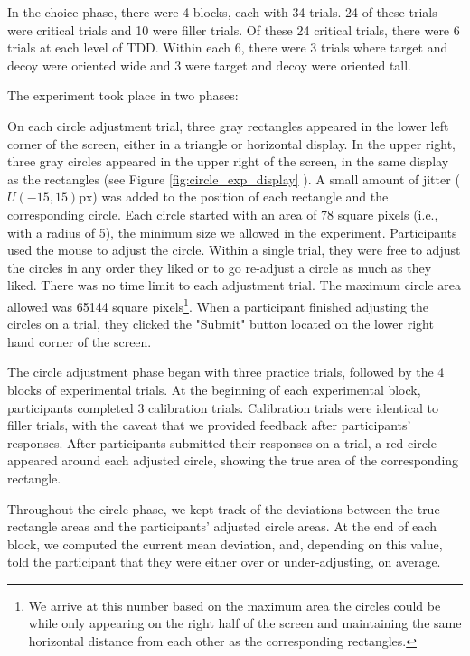\documentclass{umassthesis}          %
\begin{document}
In the choice phase, there were 4 blocks, each with 34 trials. 24 of these trials were critical trials and 10 were filler trials. Of these 24 critical trials, there were 6 trials at each level of TDD. Within each 6, there were 3 trials where target and decoy were oriented wide and 3 were target and decoy were oriented tall. 


The experiment took place in two phases: 

On each circle adjustment trial, three gray rectangles appeared in the lower left corner of the screen, either in a triangle or horizontal display. In the upper right, three gray circles appeared in the upper right of the screen, in the same display as the rectangles (see Figure \ref{fig:circle_exp_display} ). A small amount of jitter ($U(-15,15)\text{px}$) was added to the position of each rectangle and the corresponding circle. Each circle started with an area of 78 square pixels (i.e., with a radius of 5), the minimum size we allowed in the experiment. Participants used the mouse to adjust the circle. Within a single trial, they were free to adjust the circles in any order they liked or to go re-adjust a circle as much as they liked. There was no time limit to each adjustment trial. The maximum circle area allowed was 65144 square pixels\footnote{We arrive at this number based on the maximum area the circles could be while only appearing on the right half of the screen and maintaining the same horizontal distance from each other as the corresponding rectangles.}. When a participant finished adjusting the circles on a trial, they clicked the "Submit" button located on the lower right hand corner of the screen. 

The circle adjustment phase began with three practice trials, followed by the 4 blocks of experimental trials. At the beginning of each experimental block, participants completed 3 calibration trials. Calibration trials were identical to filler trials, with the caveat that we provided feedback after participants' responses. After participants submitted their responses on a trial, a red circle appeared around each adjusted circle, showing the true area of the corresponding rectangle. 

Throughout the circle phase, we kept track of the deviations between the true rectangle areas and the participants' adjusted circle areas. At the end of each block, we computed the current mean deviation, and, depending on this value, told the participant that they were either over or under-adjusting, on average.
\end{document}
